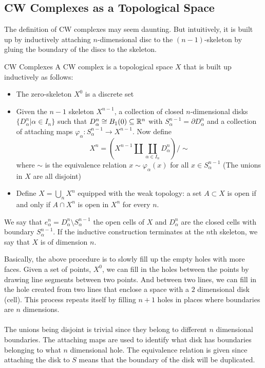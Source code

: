 \documentclass[a4paper]{article}
\begin{document}
\subsection{CW Complexes as a Topological Space}
The definition of CW complexes may seem daunting. But intuitively, it is built up by inductively attaching $n$-dimensional disc to the $(n-1)$-skeleton by gluing the boundary of the discs to the skeleton. 

\begin{defn}{CW Complexes}{} A CW complex is a topological space $X$ that is built up inductively as follows: 
\begin{itemize}
\item The zero-skeleton $X^0$ is a discrete set
\item Given the $n-1$ skeleton $X^{n-1}$, a collection of closed $n$-dimensional disks $\{D_{\alpha}^n|\alpha\in I_n\}$ such that $D_\alpha^n\cong B_1(0)\subseteq\mathbb{R}^n$ with $S_\alpha^{n-1}=\partial D_\alpha^n$ and a collection of attaching maps $\varphi_\alpha:S_\alpha^{n-1}\to X^{n-1}$. Now define $$X^n=\left(X^{n-1}\amalg\coprod_{\alpha\in I_n}D_\alpha^n\right)/\sim$$ where $\sim$ is the equivalence relation $x\sim\varphi_\alpha(x)$ for all $x\in S_\alpha^{n-1}$ (The unions in $X$ are all disjoint)
\item Define $X=\bigcup_nX^n$ equipped with the weak topology: a set $A\subset X$ is open if and only if $A\cap X^n$ is open in $X^n$ for every $n$. 
\end{itemize}
We say that $e_\alpha^n=D_\alpha^n\setminus S_\alpha^{n-1}$ the open cells of $X$ and $D_\alpha^n$ are the closed cells with boundary $S_\alpha^{n-1}$. If the inductive construction terminates at the $n$th skeleton, we say that $X$ is of dimension $n$. 
\end{defn}

Basically, the above procedure is to slowly fill up the empty holes with more faces. Given a set of points, $X^0$, we can fill in the holes between the points by drawing line segments between two points. And between two lines, we can fill in the hole created from two lines that enclose a space with a $2$ dimensional disk (cell). This process repeats itself by filling $n+1$ holes in places where boundaries are $n$ dimensions. \\~\\
The unions being disjoint is trivial since they belong to different $n$ dimensional boundaries. The attaching maps are used to identify what disk has boundaries belonging to what $n$ dimensional hole. The equivalence relation is given since attaching the disk to $S$ means that the boundary of the disk will be duplicated. \\~\\
\end{document}
